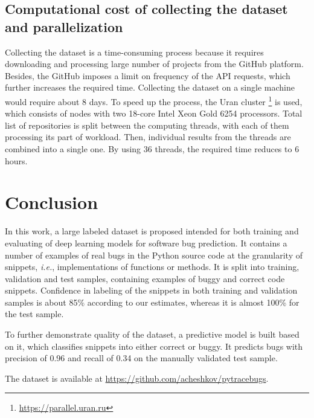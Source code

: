 \documentclass[10pt,conference]{IEEEtran}
\begin{document}
\subsection{Computational cost of collecting the dataset and parallelization}

Collecting the dataset is a time-consuming process because it requires downloading and processing large number of projects from the GitHub platform. 
Besides, the GitHub imposes a limit on frequency of the API requests, which further increases the required time.
Collecting the dataset on a single machine would require about 8 days.
To speed up the process, the Uran cluster \footnote{\url{https://parallel.uran.ru}} is used, which
consists of nodes with two 18-core Intel Xeon Gold 6254 processors. Total list of repositories is split between the computing threads, 
with each of them processing its part of workload. Then, individual results from the threads are combined into a single one. By using 36 threads, the required time reduces to 6 hours.

\section{Conclusion}\label{sec8}

In this work, a large labeled dataset is proposed intended for both training and evaluating of deep learning models
for software bug prediction. It contains a number of examples of real bugs in the Python source code at the granularity of
snippets, \textit{i.e.}, implementations of functions or methods. It is split into training, validation and test samples, containing examples of buggy and correct code snippets.
Confidence in labeling of the snippets in both training and validation samples is about 85\% according to our estimates, whereas it is almost 100\% for the test sample.

To further demonstrate quality of the dataset, a predictive model is built based on it, which classifies snippets into either correct or buggy.
It predicts bugs with precision of 0.96 and recall of 0.34 on the manually validated test sample. 

The dataset is available at \url{https://github.com/acheshkov/pytracebugs}.

\end{document}
